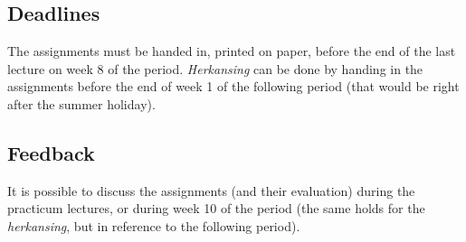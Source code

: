 	\subsection{Deadlines}
		The assignments must be handed in, printed on paper, before the end of the last lecture on week 8 of the period. \textit{Herkansing} can be done by handing in the assignments before the end of week 1 of the following period (that would be right after the summer holiday).

	\subsection{Feedback}
		It is possible to discuss the assignments (and their evaluation) during the practicum lectures, or during week 10 of the period (the same holds for the \textit{herkansing}, but in reference to the following period).
		
